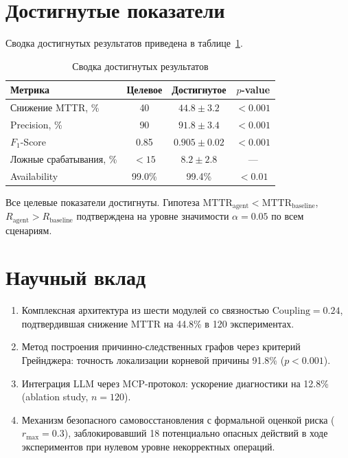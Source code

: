 \section*{Достигнутые показатели}

Сводка достигнутых результатов приведена в таблице~\ref{tab:results_summary}.

\begin{table}[H]
\centering
\small
\caption{Сводка достигнутых результатов}
\label{tab:results_summary}
\begin{tabular}{|l|c|c|c|}
\hline
\textbf{Метрика} & \textbf{Целевое} & \textbf{Достигнутое} & \textbf{$p$-value} \\
\hline
Снижение MTTR, \% & 40 & $44.8 \pm 3.2$ & $< 0.001$ \\
\hline
Precision, \% & 90 & $91.8 \pm 3.4$ & $< 0.001$ \\
\hline
$F_1$-Score & 0.85 & $0.905 \pm 0.02$ & $< 0.001$ \\
\hline
Ложные срабатывания, \% & $< 15$ & $8.2 \pm 2.8$ & --- \\
\hline
Availability & 99.0\% & 99.4\% & $< 0.01$ \\
\hline
\end{tabular}
\end{table}

Все целевые показатели достигнуты. Гипотеза $\text{MTTR}_{\text{agent}} < \text{MTTR}_{\text{baseline}}$, $R_{\text{agent}} > R_{\text{baseline}}$ подтверждена на уровне значимости $\alpha = 0.05$ по всем сценариям.

\section*{Научный вклад}

\begin{enumerate}
    \item Комплексная архитектура из шести модулей со связностью $\text{Coupling} = 0.24$, подтвердившая снижение MTTR на 44.8\% в 120 экспериментах.
    \item Метод построения причинно-следственных графов через критерий Грейнджера: точность локализации корневой причины 91.8\% ($p < 0.001$).
    \item Интеграция LLM через MCP-протокол: ускорение диагностики на 12.8\% (ablation study, $n = 120$).
    \item Механизм безопасного самовосстановления с формальной оценкой риска ($r_{\max} = 0.3$), заблокировавший 18 потенциально опасных действий в ходе экспериментов при нулевом уровне некорректных операций.
\end{enumerate}

